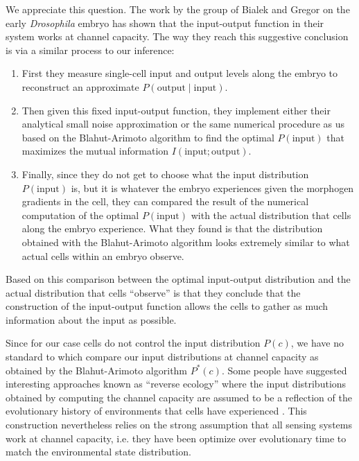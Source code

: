 We appreciate this question. The work by the group of Bialek and Gregor on the
early \textit{Drosophila} embryo has shown that the input-output function in
their system works at channel capacity. The way they reach this suggestive
conclusion is via a similar process to our inference:
\begin{enumerate}
  \item First they measure single-cell input and output levels along the embryo
  to reconstruct an approximate $P(\text{output} \mid \text{input})$.
  \item Then given this fixed input-output function, they implement either their
  analytical small noise approximation or the same numerical procedure as us
  based on the Blahut-Arimoto algorithm to find the optimal $P(\text{input})$
  that maximizes the mutual information $I(\text{input}; \text{output})$.
  \item Finally, since they do not get to choose what the input distribution
  $P(\text{input})$ is, but it is whatever the embryo experiences given the
  morphogen gradients in the cell, they can compared the result of the numerical
  computation of the optimal $P(\text{input})$ with the actual distribution that
  cells along the embryo experience. What they found is that the distribution
  obtained with the Blahut-Arimoto algorithm looks extremely similar to what
  actual cells within an embryo observe.
\end{enumerate}
Based on this comparison between the optimal input-output distribution and the
actual distribution that cells ``observe'' is that they conclude that the
construction of the input-output function allows the cells to gather as much
information about the input as possible.

Since for our case cells do not control the input distribution $P(c)$, we have
no standard to which compare our input distributions at channel capacity as
obtained by the Blahut-Arimoto algorithm $P^*(c)$. Some people have suggested
interesting approaches known as ``reverse ecology'' where the input
distributions obtained by computing the channel capacity are assumed to be a
reflection of the evolutionary history of environments that cells have
experienced \cite{Bowsher2012}. This construction nevertheless relies on the
strong assumption that all sensing systems work at channel capacity, i.e. they
have been optimize over evolutionary time to match the environmental state
distribution.
